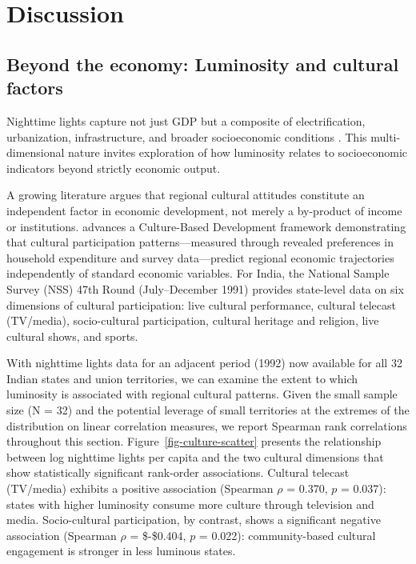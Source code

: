\documentclass[
  a4paper, 
  twoside,
  review
]{article}
\begin{document}
\section{Discussion}\label{discussion}

\subsection{Beyond the economy: Luminosity and cultural
factors}\label{beyond-the-economy-luminosity-and-cultural-factors}

Nighttime lights capture not just GDP but a composite of
electrification, urbanization, infrastructure, and broader socioeconomic
conditions
\citep{henderson_storeygard_weil_lights, mellander_etal_lights_gdp}.
This multi-dimensional nature invites exploration of how luminosity
relates to socioeconomic indicators beyond strictly economic output.

A growing literature argues that regional cultural attitudes constitute
an independent factor in economic development, not merely a by-product
of income or institutions. \citet{tubadji_cultural_entropy} advances a
Culture-Based Development framework demonstrating that cultural
participation patterns---measured through revealed preferences in
household expenditure and survey data---predict regional economic
trajectories independently of standard economic variables. For India,
the National Sample Survey (NSS) 47th Round (July--December 1991)
provides state-level data on six dimensions of cultural participation:
live cultural performance, cultural telecast (TV/media), socio-cultural
participation, cultural heritage and religion, live cultural shows, and
sports.

With nighttime lights data for an adjacent period (1992) now available
for all 32 Indian states and union territories, we can examine the
extent to which luminosity is associated with regional cultural
patterns. Given the small sample size (N = 32) and the potential
leverage of small territories at the extremes of the distribution on
linear correlation measures, we report Spearman rank correlations
throughout this section. Figure~\ref{fig-culture-scatter} presents the
relationship between log nighttime lights per capita and the two
cultural dimensions that show statistically significant rank-order
associations. Cultural telecast (TV/media) exhibits a positive
association (Spearman \(\rho\) = 0.370, \(p\) = 0.037): states with
higher luminosity consume more culture through television and media.
Socio-cultural participation, by contrast, shows a significant negative
association (Spearman \(\rho\) = \$-\$0.404, \(p\) = 0.022):
community-based cultural engagement is stronger in less luminous states.
\end{document}

